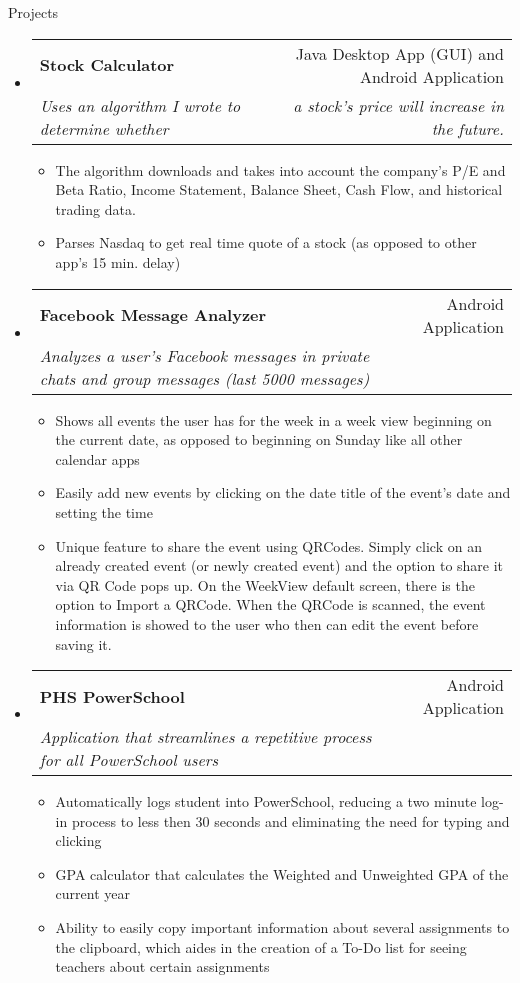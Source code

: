 \documentclass[letterpaper,11pt]{article}
\makeatletter
\newcommand{\resitem}[1]{\item #1 \vspace{-2pt}}
\newcommand{\resheading}[1]{{\large \parashade[.9]{sharpcorners}{\textbf{#1 \vphantom{p\^{E}}}}}}
\newcommand{\ressubheading}[4]{
\begin{tabular*}{6.5in}{l@{\extracolsep{\fill}}r}
		\textbf{#1} & #2 \\
		\textit{#3} & \textit{#4} \\
\end{tabular*}\vspace{-6pt}}
\makeatother
\begin{document}
\begin{description} \item[Projects] \end{description}
\begin{itemize}

\item
	\ressubheading{Stock Calculator}{Java Desktop App (GUI) and Android Application}{Uses an algorithm I wrote to determine whether}{a stock's price will increase in the future.\space\space\space\space\space\space\space\space\space}
	\begin{itemize}
		\resitem{The algorithm downloads and takes into account the company’s P/E and Beta Ratio, Income Statement, Balance Sheet, Cash Flow, and historical trading data.}
		\resitem{Parses Nasdaq to get real time quote of a stock (as opposed to other app's 15 min. delay)}
	\end{itemize}

\item
	\ressubheading{Facebook Message Analyzer}{Android Application}{Analyzes a user’s Facebook messages in private chats and group messages (last 5000 messages)}{}
	\begin{itemize}
		\resitem{Shows all events the user has for the week in a week view beginning on the current date, as opposed to beginning on Sunday like all other calendar apps}
		\resitem{Easily add new events by clicking on the date title of the event’s date and setting the time}
		\resitem{Unique feature to share the event using QRCodes. Simply click on an already created event (or newly created event) and the option to share it via QR Code pops up. On the WeekView default screen, there is the option to Import a QRCode. When the QRCode is scanned, the event information is showed to the user who then can edit the event before saving it.}
	\end{itemize}

\item
	\ressubheading{PHS PowerSchool}{Android Application}{Application that streamlines a repetitive process for all PowerSchool users}{}
	\begin{itemize}
		\resitem{Automatically logs student into PowerSchool, reducing a two minute log-in process to less then 30 seconds and eliminating the need for typing and clicking}
		\resitem{GPA calculator that calculates the Weighted and Unweighted GPA of the current year}
		\resitem{Ability to easily copy important information about several assignments to the clipboard, which aides in the creation of a To-Do list for seeing teachers about certain assignments}
	\end{itemize}
\end{itemize}
\end{document}
